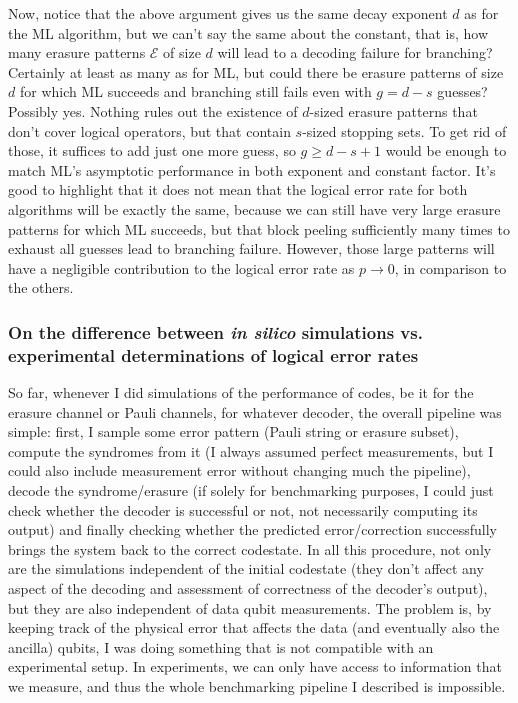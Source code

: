 \documentclass{article}
\begin{document}
Now, notice that the above argument gives us the same decay exponent $d$ as for the ML algorithm, but we can't say the same about the constant, that is, how many erasure patterns $\mathcal{E}$ of size $d$ will lead to a decoding failure for branching? Certainly at least as many as for ML, but could there be erasure patterns of size $d$ for which ML succeeds and branching still fails even with $g = d-s$ guesses? Possibly yes. Nothing rules out the existence of $d$-sized erasure patterns that don't cover logical operators, but that contain $s$-sized stopping sets. To get rid of those, it suffices to add just one more guess, so $g \ge d-s+1$ would be enough to match ML's asymptotic performance in both exponent and constant factor. It's good to highlight that it does not mean that the logical error rate for both algorithms will be exactly the same, because we can still have very large erasure patterns for which ML succeeds, but that block peeling sufficiently many times to exhaust all guesses lead to branching failure. However, those large patterns will have a negligible contribution to the logical error rate as $p \rightarrow 0$, in comparison to the others. 





\subsubsection{On the difference between \textit{in silico} simulations vs. experimental determinations of logical error rates}

So far, whenever I did simulations of the performance of codes, be it for the erasure channel or Pauli channels, for whatever decoder, the overall pipeline was simple: first, I sample some error pattern (Pauli string or erasure subset), compute the syndromes from it (I always assumed perfect measurements, but I could also include measurement error without changing much the pipeline), decode the syndrome/erasure (if solely for benchmarking purposes, I could just check whether the decoder is successful or not, not necessarily computing its output) and finally checking whether the predicted error/correction successfully brings the system back to the correct codestate. In all this procedure, not only are the simulations independent of the initial codestate (they don't affect any aspect of the decoding and assessment of correctness of the decoder's output), but they are also independent of data qubit measurements. The problem is, by keeping track of the physical error that affects the data (and eventually also the ancilla) qubits, I was doing something that is not compatible with an experimental setup. In experiments, we can only have access to information that we measure, and thus the whole benchmarking pipeline I described is impossible. 
\end{document}
